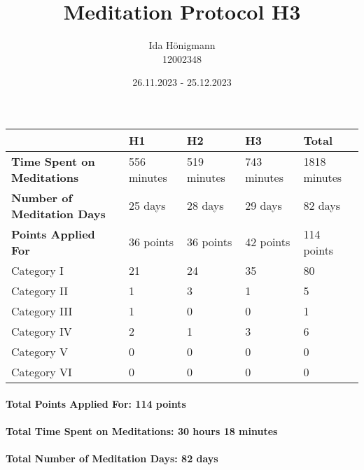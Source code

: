 \documentclass[11pt,a4paper]{article}
\begin{document}
\afterpage{\restorepagecolor}
\title{\LARGE\bfseries Meditation Protocol H3}
\author{Ida Hönigmann \\ 12002348}
\date{26.11.2023 - 25.12.2023}
\maketitle

\begin{tabular}{l|l|l|l|l}
	                                   & \textbf{H1} & \textbf{H2} & \textbf{H3} & \textbf{Total}\\
	\hline
	\textbf{Time Spent on Meditations} & 556 minutes & 519 minutes & 743 minutes & 1818 minutes  \\
	\textbf{Number of Meditation Days} & 25 days     & 28 days     & 29 days     & 82 days       \\
	\textbf{Points Applied For}        & 36 points   & 36 points   & 42 points   & 114 points    \\
	\hline
	Category I                         & 21          & 24          & 35          & 80            \\
	Category II                        & 1           & 3           & 1           & 5             \\
	Category III                       & 1           & 0           & 0           & 1             \\
	Category IV                        & 2           & 1           & 3           & 6             \\
	Category V                         & 0           & 0           & 0           & 0             \\
	Category VI                        & 0           & 0           & 0           & 0             \\
\end{tabular}

\paragraph{Total Points Applied For: 114 points}
\paragraph{Total Time Spent on Meditations: 30 hours 18 minutes}
\paragraph{Total Number of Meditation Days: 82 days}
\end{document}
